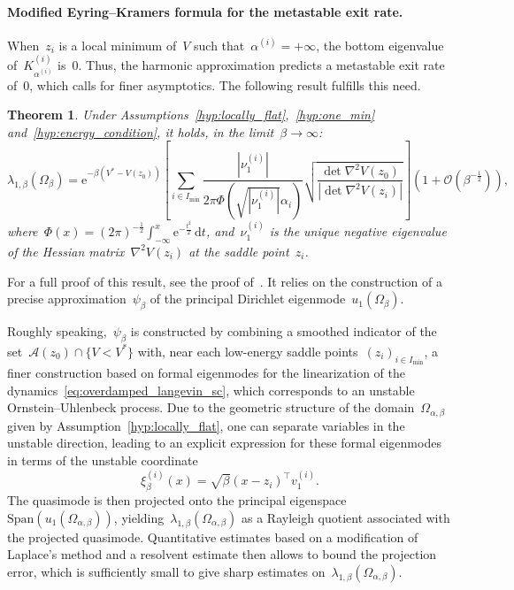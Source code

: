 \documentclass[a4]{article}
\renewcommand{\d}{\mathrm{d}}
\newcommand{\e}{\mathrm{e}}
\newcommand{\1}{\mathbbm 1}
\newcommand{\basin}[1]{\mathcal A(#1)}
\newcommand{\epsLimit}[1]{\alpha^{(#1)}}
\newcommand{\hessEigvec}[2]{v^{(#1)}_{#2}} %
\newcommand{\hessEigval}[2]{\nu^{(#1)}_{#2}} %
\newcommand{\Vstar}{V^*}
\newcommand{\bigo}{\mathcal{O}}
\newtheorem{theorem}{Theorem}
\begin{document}
    \paragraph{Modified Eyring--Kramers formula for the metastable exit rate.}
    When~$z_i$ is a local minimum of~$V$ such that~$\epsLimit{i}=+\infty$, the bottom eigenvalue of~$K_{\epsLimit{i}}^{(i)}$ is~$0$. Thus, the harmonic approximation predicts a metastable exit rate of~$0$, which calls for finer asymptotics.
    The following result fulfills this need.
    \begin{theorem}
        \label{thm:eyring_kramers}
        Under Assumptions~\ref{hyp:locally_flat},~\ref{hyp:one_min} and~\ref{hyp:energy_condition},
        it holds, in the limit~$\beta\to\infty$:
        \begin{equation}
            \label{eq:eyring_kramers}
            \lambda_{1,\beta}(\Omega_{\beta}) = \e^{-\beta\left(\Vstar-V(z_0)\right)} \left[\sum_{i\in I_{\min}} \frac{|\hessEigval{i}{1}|}{2\pi\Phi\left(\sqrt{|\hessEigval{i}{1}|}\alpha_i\right)}\sqrt{\frac{\det \nabla^2 V(z_0)}{\left|\det \nabla ^2 V(z_i)\right|}}\right]\left(1 +\bigo(\beta^{-\frac12})\right),
        \end{equation}
        where~$\Phi(x)=(2\pi)^{-\frac12}\int_{-\infty}^x\e^{-\frac{t^2}2}\,\d t$, and~$\hessEigval{i}{1}$ is the unique negative eigenvalue of the Hessian matrix~$\nabla^2 V(z_i)$ at the saddle point~$z_i$.
    \end{theorem}
    For a full proof of this result, see the proof of~\cite[Theorem 5]{BLS24}. It relies on the construction of a precise approximation~$\psi_\beta$ of the principal Dirichlet eigenmode~$u_1(\Omega_\beta)$.
    
    Roughly speaking,~$\psi_\beta$ is constructed by combining a smoothed indicator of the set~$\basin{z_0}\cap \{V<\Vstar\}$ with, near each low-energy saddle points~$(z_i)_{i\in I_{\min}}$, a finer construction based on formal eigenmodes for the linearization of the dynamics~\eqref{eq:overdamped_langevin_sc}, which corresponds to an unstable Ornstein--Uhlenbeck process.
    Due to the geometric structure of the domain~$\Omega_{\alpha,\beta}$ given by Assumption~\ref{hyp:locally_flat}, one can separate variables in the unstable direction, leading to an explicit expression for these formal eigenmodes in terms of the unstable coordinate
    $$\xi_\beta^{(i)}(x) = \sqrt{\beta}(x-z_i)^\top \hessEigvec{i}{1}.$$
    The quasimode is then projected onto the principal eigenspace~$\mathrm{Span}(u_1(\Omega_{\alpha,\beta}))$, yielding~$\lambda_{1,\beta}(\Omega_{\alpha,\beta})$ as a Rayleigh quotient associated with the projected quasimode. Quantitative estimates based on a modification of Laplace's method and a resolvent estimate then allows to bound the projection error, which is sufficiently small to give sharp estimates on~$\lambda_{1,\beta}(\Omega_{\alpha,\beta})$.
\end{document}
